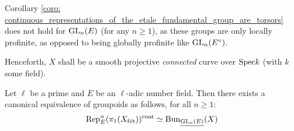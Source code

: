         \begin{remark}
            Corollary \ref{coro: continuous_representations_of_the_etale_fundamental_group_are_torsors} does not hold for $\operatorname{GL}_n(E)$ (for any $n \geq 1$), as these groups are only locally profinite, as opposed to being globally profinite like $\operatorname{GL}_n(E^{\circ})$.
        \end{remark}
    
        \begin{convention} \label{conv: base_curve}
            Henceforth, $X$ shall be a smooth projective \textit{connected} curve over $\mathrm{Spec} k$ (with $k$ some field).
        \end{convention}
        
        \begin{proposition} \label{prop: E_representations_are_E_local_systems}
            Let $\ell$ be a prime and $E$ be an $\ell$-adic number field. Then there exists a canonical equivalence of groupoids as follows, for all $n \geq 1$:
                $$\mathrm{Rep}_E^n(\pi_1(X_{\mathrm{f\acute{e}t}}))^{\mathrm{cont}} \simeq \mathrm{Bun}_{\underline{\operatorname{GL}_n(E)}}(X)$$
        \end{proposition}
